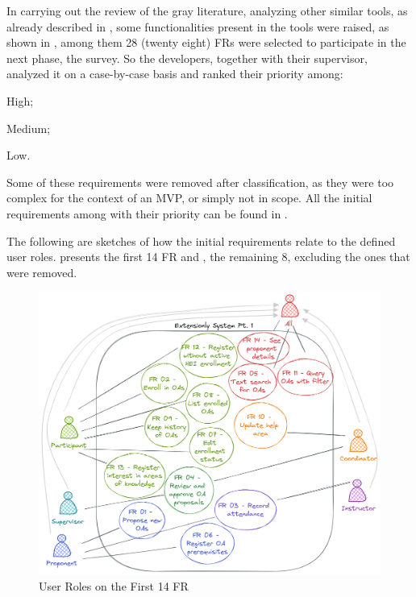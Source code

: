 In carrying out the review of the gray literature, analyzing other similar tools, as already described in , some functionalities present in the tools were raised, as shown in , among them 28 (twenty eight) \acp{FR} were selected to participate in the next phase, the survey.
So the developers, together with their supervisor, analyzed it on a case-by-case basis and ranked their priority among:
\begin{inparaenum}[(1)]
    \item High;
    \item Medium;
    \item Low.
\end{inparaenum}
Some of these requirements were removed after classification, as they were too complex for the context of an \ac{MVP}, or simply not in scope. All the initial requirements among with their priority can be found in .



The following are sketches of how the initial requirements relate to the defined user roles.  presents the first 14 \ac{FR} and , the remaining 8, excluding the ones that were removed.

\begin{figure}[!htb]
  \caption{User Roles on the First 14 \ac{FR}}\label{fig:use-case-1}
  \begin{center}
    \includegraphics[width=15cm]{img/6-use-case-1.png}
  \end{center}
\end{figure}

